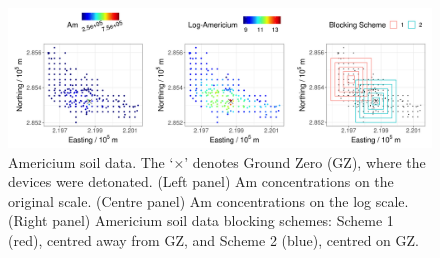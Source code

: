 \documentclass[nojss]{jss}
\newcommand{\red}[1]{\textcolor{red}{#1}}
\begin{document}
\begin{figure}
    \centering
    \includegraphics[width = \linewidth]{img/Am_data_and_blocks.png}
    \caption{Americium soil data. The `$\times$' denotes Ground Zero (GZ), where the devices were detonated. (Left panel) Am concentrations on the original scale. (Centre panel) Am concentrations on the log scale. (Right panel) Americium soil data blocking schemes: Scheme 1 (red), centred away from GZ, and Scheme 2 (blue), centred on GZ. 
}   
  \label{fig:Am_data}
\end{figure}
\end{document}
